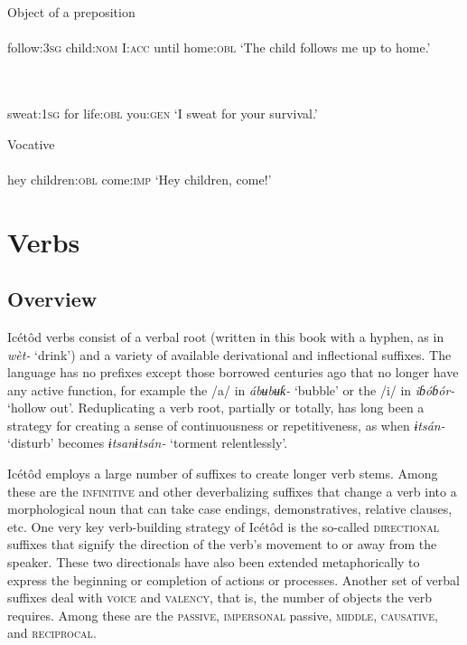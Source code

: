 Object of a preposition
\ea\label{ex:}
 \\
    \\
follow:\textsc{3sg}   child:\textsc{nom}   I:\textsc{acc}   until   home:\textsc{obl}
\glt ‘The child follows me up to home.’ 
\z




\ea\label{ex:}
 \\
    \\
sweat:\textsc{1sg}   for     life:\textsc{obl}   you:\textsc{gen}
\glt ‘I sweat for your survival.’ 
\z





Vocative
\ea\label{ex:}
 \\
    \\
hey   children:\textsc{obl}  come:\textsc{imp}
\glt ‘Hey children, come!’ 
\z




\section{Verbs}



\subsection{Overview}


Icétôd verbs consist of a verbal root (written in this book with a hyphen, as in \textit{wèt-} ‘drink’) and a variety of available derivational and inflectional suffixes. The language has no prefixes except those borrowed centuries ago that no longer have any active function, for example the /a/ in \textit{ábʉbʉƙ-} ‘bubble’ or the /i/ in \textit{iɓóɓór-} ‘hollow out’. Reduplicating a verb root, partially or totally, has long been a strategy for creating a sense of continuousness or repetitiveness, as when \textit{ɨtsán-} ‘disturb’ becomes \textit{ɨtsanɨtsán-} ‘torment relentlessly’. 

Icétôd employs a large number of suffixes to create longer verb stems. Among these are the \textsc{infinitive} and other deverbalizing suffixes that change a verb into a morphological noun that can take case endings, demonstratives, relative clauses, etc. One very key verb-building strategy of Icétôd is the so-called \textsc{directional} suffixes that signify the direction of the verb’s movement to or away from the speaker. These two directionals have also been extended metaphorically to express the beginning or completion of actions or processes. Another set of verbal suffixes deal with \textsc{voice} and \textsc{valency}, that is, the number of objects the verb requires. Among these are the \textsc{passive}, \textsc{impersonal} passive, \textsc{middle}, \textsc{causative}, and \textsc{reciprocal}.

